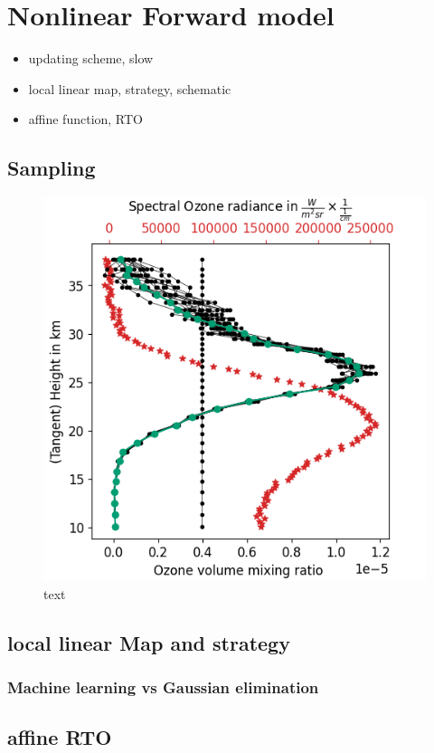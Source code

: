 \chapter{Nonlinear Forward model}
\begin{itemize}
	\item updating scheme, slow
	\item local linear map, strategy, schematic
	\item affine function, RTO
\end{itemize}

\section{Sampling}

\begin{figure}[h]
	\centering
	\includegraphics[width=\textwidth]{NonLinFirstRecRes.png}
	\caption[]{text}
	\label{fig:Results}
\end{figure}

\section{local linear Map and strategy}

\subsection{Machine learning vs Gaussian elimination}

\section{affine RTO}